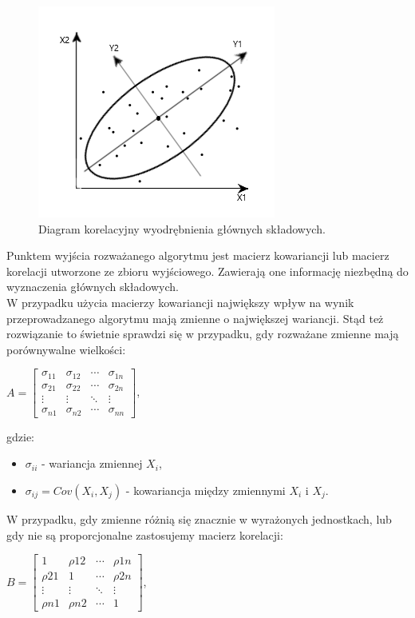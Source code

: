 \documentclass[12pt,a4paper]{report}
\begin{document}
\begin{center}
\begin{figure}[h]
\includegraphics[scale=1.7]{obrazek.PNG} 
\caption{Diagram korelacyjny wyodrębnienia głównych składowych.}
\end{figure}
\end{center}
Punktem wyjścia rozważanego algorytmu jest macierz kowariancji lub macierz korelacji utworzone ze zbioru wyjściowego. Zawierają one informację niezbędną do wyznaczenia głównych składowych.
\\W przypadku użycia macierzy kowariancji największy wpływ na wynik przeprowadzanego algorytmu mają zmienne o największej wariancji. Stąd też rozwiązanie to świetnie sprawdzi się w przypadku, gdy rozważane zmienne mają porównywalne wielkości: 
\begin{center}
$ A= \left[
        \begin{array}{cccc}
         \sigma_{11} & \sigma_{12} & \cdots & \sigma_{1n}\\
         \sigma_{21} & \sigma_{22} & \cdots & \sigma_{2n}\\
         \vdots & \vdots & \ddots & \vdots\\
         \sigma_{n1} & \sigma_{n2} & \cdots & \sigma_{nn}
         \end{array}
      \right]$, 
\end{center}
gdzie:
\begin{itemize}
\item $\sigma_{ii}$ - wariancja zmiennej $X_i$,
\item $\sigma_{ij}=Cov(X_i,X_j)$ - kowariancja między zmiennymi $X_i$ i $X_j$.
\end{itemize}
W przypadku, gdy zmienne różnią się znacznie w wyrażonych jednostkach, lub gdy nie są proporcjonalne zastosujemy macierz korelacji:
\begin{center}
$ B= \left[
        \begin{array}{cccc}
         1 & \rho{12} & \cdots & \rho{1n}\\
         \rho{21} & 1 & \cdots & \rho{2n}\\
         \vdots & \vdots & \ddots & \vdots\\
         \rho{n1} & \rho{n2} & \cdots & 1
         \end{array}
      \right]$, 
\end{center}
\end{document}

